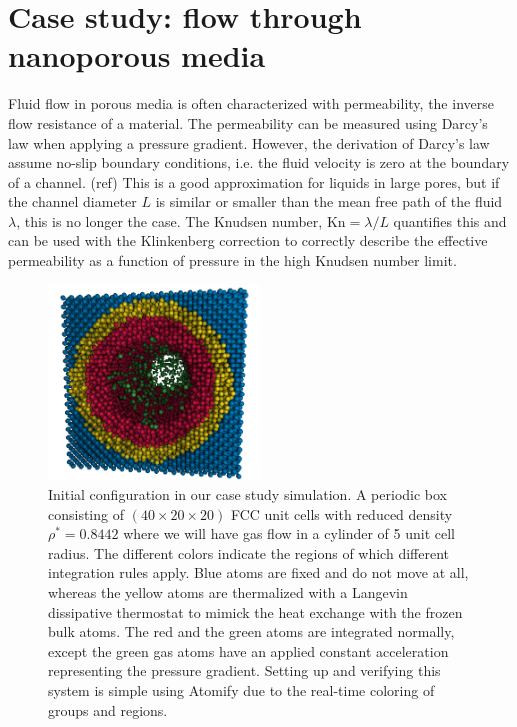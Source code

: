 \documentclass[aps,pre,twocolumn,letterpaper,floatfix,nofootinbib]{revtex4}
\begin{document}
\section{\label{sec:casestudy}Case study: flow through nanoporous media}
Fluid flow in porous media is often characterized with permeability, the inverse flow resistance of a material.
The permeability can be measured using Darcy's law when applying a pressure gradient.
However, the derivation of Darcy's law assume no-slip boundary conditions, i.e. the fluid velocity is zero at the boundary of a channel. (ref)
This is a good approximation for liquids in large pores, but if the channel diameter $L$ is similar or smaller than the mean free path of the fluid $\lambda$, this is no longer the case.
The Knudsen number, $\text{Kn} = \lambda / L$ quantifies this and can be used with the Klinkenberg correction\citep{klinkenberg1941permeability} to correctly describe the effective permeability as a function of pressure in the high Knudsen number limit.

\begin{figure}
	\centering
	\includegraphics[width=0.5\textwidth]{lj_flow/configuration.png}
	\caption{
		Initial configuration in our case study simulation.
		A periodic box consisting of $(40\times20\times20)$ FCC unit cells with reduced density $\rho^* = 0.8442$ where we will have gas flow in a cylinder of 5 unit cell radius.
		The different colors indicate the regions of which different integration rules apply.
		\textcolor{atomify-blue}{Blue} atoms are fixed and do not move at all,
		whereas the \textcolor{atomify-yellow}{yellow} atoms are thermalized with a Langevin\citep{schneider1978molecular} dissipative thermostat to mimick the heat exchange with the frozen bulk atoms.
		The \textcolor{atomify-red}{red} and the \textcolor{atomify-green}{green} atoms are integrated normally, except the \textcolor{atomify-green}{green} gas atoms have an applied constant acceleration representing the pressure gradient.
		Setting up and verifying this system is simple using Atomify due to the real-time coloring of groups and regions.
    }
	\label{fig:cylinder_simulation}
\end{figure}
\end{document}
